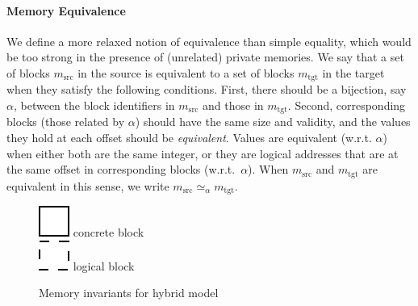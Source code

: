 \paragraph{Memory Equivalence}
We define a more relaxed notion of equivalence than simple equality,
which would be too strong in the presence of (unrelated) private
memories. We say that a set of blocks $m_\textrm{src}$ in the source
is equivalent to a set of blocks $m_\textrm{tgt}$ in the target
when they satisfy the following conditions. First, there should be a
bijection, say $\alpha$, between the block identifiers in
$m_\textrm{src}$ and those in $m_\textrm{tgt}$. Second, corresponding
blocks (\ie those related by $\alpha$) should have the same
size and validity, and the values they hold at each offset should be \emph{equivalent}.  Values are
equivalent (w.r.t. $\alpha$) when either both are the same integer, or
they are logical addresses that are at the same offset in corresponding blocks
(w.r.t.~$\alpha$). When $m_\textrm{src}$ and $m_\textrm{tgt}$ are equivalent in this sense, we write $m_\textrm{src} \simeq_\alpha m_\textrm{tgt}$.

\begin{figure}[t]
\center
  \begin{minipage}[b]{0.5\textwidth}
  \end{minipage}
  \begin{minipage}[b]{0.3\textwidth}
  \includegraphics[scale=0.25]{intptrcast-figure/physical-block.png} concrete block\\[2mm]
  \includegraphics[scale=0.25]{intptrcast-figure/logical-block.png} logical block\\
  \mbox{}
  \end{minipage}
\caption{Memory invariants for hybrid model}\label{fig:invariant}
\end{figure}

